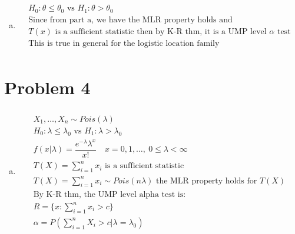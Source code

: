 \documentclass{article}
\newcommand{\lm}{\lambda}
\newcommand{\sumn}{\sum_{i=1}^{n}}
\newcommand{\sumx}{\sum_{i=1}^{n}x_i}
\newcommand{\ta}{\theta}
\newcommand{\samp}{X_1,\dots,X_n \sim}
\newcommand{\hyp}[2]{H_0: #1 \text{ vs } H_1: #2}
\newcommand{\pois}[2]{\dfrac{e^{-#1}{#1}^{#2}}{{#2}!}}
\begin{document}
\begin{flushleft}
\begin{enumerate}[(a)]
	\item 
\begin{multline*}\\
H_0:\ta \leq \ta_0 \text{ vs } H_1:\ta > \ta_0\\
\text{Since from part a, we have the MLR property holds and }\\
T(x) \text{ is a sufficient statistic then by K-R thm, it is a UMP level } \alpha \text{ test}\\
\text{This is true in general for the logistic location family}\\
\end{multline*}
	
\end{enumerate}
\pagebreak
	\section*{Problem 4}
	
\begin{enumerate}[(a)]
	
	\item 	
\begin{multline*}\\
\samp Pois(\lm)\\
\hyp{\lm\leq \lm_0}{\lm > \lm_0}\\
f(x|\lm)=\pois{\lm}{x} \quad x=0,1,\dots, \ 0\leq \lm <\infty\\
T(X)=\sumx \text{ is a sufficient statistic}\\
T(X)=\sumx\sim Pois(n\lm) \text{ the MLR property holds for } T(X)\\
\text{By K-R thm, the UMP level alpha test is:}\\
R=\{x:\sumx>c \}\\
\alpha=P(\sumn X_i>c|\lm=\lm_0)\\
\end{multline*}


\end{enumerate}
\end{flushleft}
\end{document}
